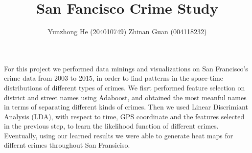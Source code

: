 \documentclass[12pt]{article}
\newenvironment{abs}[2][Abstract]{\begin{trivlist}
\item[\hskip \labelsep {\bfseries #1}\hskip \labelsep {\bfseries #2}]}{\end{trivlist}}
\newenvironment{p1}[2][Motivation]{\begin{trivlist}
\item[\hskip \labelsep {\bfseries #1}\hskip \labelsep {\bfseries #2}]}{\end{trivlist}}
\newenvironment{p2}[2][Data]{\begin{trivlist}
\item[\hskip \labelsep {\bfseries #1}\hskip \labelsep {\bfseries #2}]}{\end{trivlist}}
\begin{document}
 
 
\title{San Fancisco Crime Study}
\author{Yunzhong He (204010749) Zhinan Guan (004118232)}
\maketitle

\begin{abs}{}
\item{}
For this project we performed data minings and visualizations on San Francisco's crime data from 2003 to 2015, in order to find patterns in the space-time distributions of different types of crimes. We fisrt performed feature selection on district and street names using Adaboost, and obtained the most meanful names in terms of separating different kinds of crimes. Then we used Linear Discrimiant Analysis (LDA), with respect to time, GPS coordinate and the features selected in the previous step, to learn the likelihood function of different crimes. Eventually, using our learned results we were able to generate heat maps for differnt crimes throughout San Fransiciso.
\end{abs}

\begin{p1}{}
\item{}
\end{p1}

\begin{p2}{}
\item{}
\end{p2}


 
\end{document}
